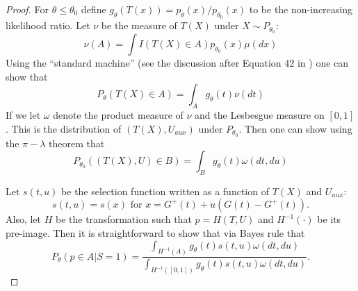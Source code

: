 \documentclass{article}
\begin{document}
\begin{appendix}
\begin{proof}
For $\theta \leq \theta_0$ define $g_{\theta}(T(x)) = p_{\theta}(x)/p_{\theta_0}(x)$ to be the non-increasing likelihood ratio. Let $\nu$ be the measure of $T(X)$ under $X \sim P_{\theta_0}$:
\begin{equation*}
    \nu(A) = \int I(T(X) \in A) p_{\theta_0}(x) \mu(dx)
\end{equation*}
Using the ``standard machine'' (see the discussion after Equation 42 in \cite{Lei}) one can show that 
\begin{equation*}
    P_{\theta}(T(X) \in A) = \int_{A} g_{\theta}(t) \nu(dt)
\end{equation*}
If we let $\omega$ denote the product measure of $\nu$ and the Lesbesgue measure on $[0, 1]$. This is the distribution of $(T(X), U_{aux})$ under $P_{\theta_0}$. Then one can show using the $\pi-\lambda$ theorem that 
\begin{equation*}
    P_{\theta_0}((T(X), U) \in B) = \int_B g_{\theta}(t) \omega(dt, du) 
\end{equation*}

Let $s(t, u)$ be the selection function written as a function of $T(X)$ and $U_{aux}$:
\begin{equation*}
    s(t, u) = s(x) \text{ for } x = G^+(t) + u(G(t) - G^+(t)). 
\end{equation*}
Also, let $H$ be the transformation such that $p = H(T, U)$ and $H^{-1}(\cdot)$ be its pre-image. Then it is straightforward to show that via Bayes rule that 
\begin{equation*}
    P_{\theta}(p \in A| S = 1) = \frac{\int_{H^{-1}(A)} g_{\theta}(t) s(t, u) \omega(dt, du) }{\int_{H^{-1}([0, 1])} g_{\theta}(t) s(t, u) \omega(dt, du)}. 
\end{equation*}


\end{proof}
\end{appendix}
\end{document}
